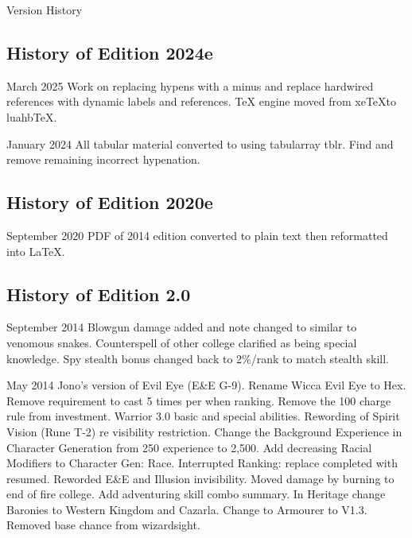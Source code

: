 \begin{Chapter}{Version History}

\subsection{History of Edition 2024e}

\begin{Description}

\item[March 2025] Work on replacing hypens with a minus and
  replace hardwired references with dynamic labels and
  references.  TeX engine moved from xe\TeX to luahb\TeX.
    
\item[January 2024] All tabular material converted to using
  tabularray tblr.  Find and remove remaining incorrect hypenation.

\subsection{History of Edition 2020e}

\item[September 2020] PDF of 2014 edition converted to plain
text then reformatted into \LaTeX.

\end{Description}

\subsection{History of Edition 2.0}

\begin{Description}

\item[September 2014] Blowgun damage added and note changed to similar
  to venomous snakes.  Counterspell of other college clarified as
  being special knowledge.  Spy stealth bonus changed back to 2\%/rank
  to match stealth skill.

\item[May 2014] Jono's version of Evil Eye (E\&E G-9).  Rename Wicca
  Evil Eye to Hex.  Remove requirement to cast 5 times per when
  ranking.  Remove the 100 charge rule from investment.  Warrior 3.0
  basic and special abilities.  Rewording of Spirit Vision (Rune T-2)
  re visibility restriction.  Change the Background Experience in
  Character Generation from 250 experience to 2,500.  Add decreasing
  Racial Modifiers to Character Gen: Race.  Interrupted Ranking:
  replace completed with resumed.  Reworded E\&E and Illusion
  invisibility.  Moved damage by burning to end of fire college.  Add
  adventuring skill combo summary.  In Heritage change Baronies to
  Western Kingdom and Cazarla.  Change to Armourer to V1.3.  Removed
  base chance from wizardsight.


\end{Description}
\end{Chapter}
